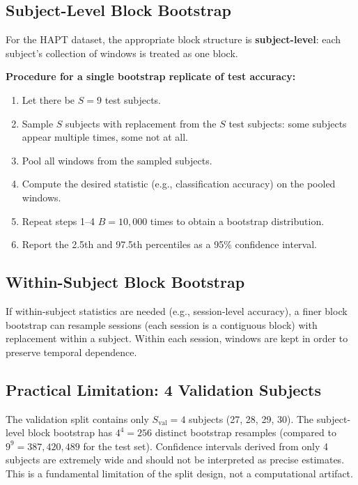 \documentclass[11pt, a4paper]{article}
\theoremstyle{definition}
\theoremstyle{plain}
\begin{document}
\subsection{Subject-Level Block Bootstrap}

For the HAPT dataset, the appropriate block structure is \textbf{subject-level}:
each subject's collection of windows is treated as one block.

\textbf{Procedure for a single bootstrap replicate of test accuracy:}
\begin{enumerate}[leftmargin=1.5em]
  \item Let there be $S = 9$ test subjects.
  \item Sample $S$ subjects with replacement from the $S$ test subjects: some
        subjects appear multiple times, some not at all.
  \item Pool all windows from the sampled subjects.
  \item Compute the desired statistic (e.g., classification accuracy) on the pooled windows.
  \item Repeat steps 1--4 $B = 10{,}000$ times to obtain a bootstrap distribution.
  \item Report the 2.5th and 97.5th percentiles as a 95\% confidence interval.
\end{enumerate}

\subsection{Within-Subject Block Bootstrap}

If within-subject statistics are needed (e.g., session-level accuracy), a finer
block bootstrap can resample sessions (each session is a contiguous block) with
replacement within a subject. Within each session, windows are kept in order to
preserve temporal dependence.

\subsection{Practical Limitation: 4 Validation Subjects}

The validation split contains only $S_{\text{val}} = 4$ subjects (27, 28, 29, 30).
The subject-level block bootstrap has $4^4 = 256$ distinct bootstrap resamples
(compared to $9^9 = 387,420,489$ for the test set). Confidence intervals derived from
only 4 subjects are extremely wide and should not be interpreted as precise estimates.
This is a fundamental limitation of the split design, not a computational artifact.
\end{document}
